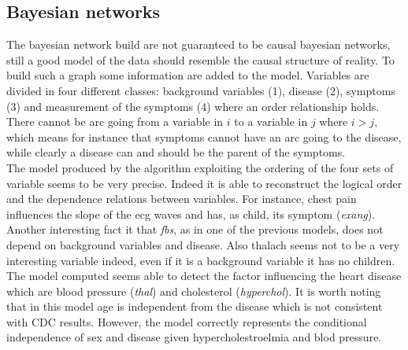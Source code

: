 \documentclass{article}
\begin{document}
\subsection{Bayesian networks}
The bayesian network build are not guaranteed to be causal bayesian networks, still a good model of the data should resemble the causal structure of reality. To build such a graph some information are added to the model. Variables are divided in four different classes: background variables (1), disease (2), symptoms (3) and measurement of the symptoms (4) where an order relationship holds. There cannot be arc going from a variable in $i$ to a variable in $j$ where $i > j$, which means for instance that symptoms cannot have an arc going to the disease, while clearly a disease can and should be the parent of the symptoms. \\

The model produced by the algorithm exploiting the ordering of the four sets of variable seems to be very precise. Indeed it is able to reconstruct the logical order and the dependence relations between variables. For instance, chest pain influences the slope of the ecg waves and has, as child, its symptom (\textit{exang}). 
Another interesting fact it that \textit{fbs}, as in one of the previous models, does not depend on background variables and disease.
Also thalach seems not to be a very interesting variable indeed, even if it is a background variable it has no children. \\
The model computed seems able to detect the factor influencing the heart disease which are blood pressure (\textit{thal}) and cholesterol (\textit{hyperchol}). It is worth noting that in this model age is independent from the disease which is not consistent with CDC results. However, the model correctly represents the conditional independence of sex and disease given hypercholestroelmia and blod pressure.\\
\end{document}
